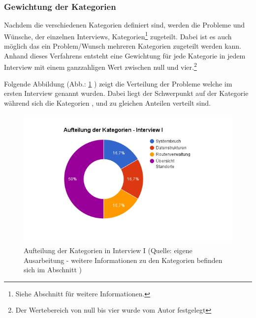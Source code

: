 \documentclass[Bachelorarbeit.tex]{subfiles}
\begin{document}
\subsubsection{Gewichtung der Kategorien}
\label{analyse:gewichtung}

Nachdem die verschiedenen Kategorien definiert sind, werden die Probleme und Wünsche, der einzelnen Interviews, Kategorien\footnote{
	Siehe Abschnitt  für weitere Informationen.
	}
zugeteilt.
Dabei ist es auch möglich das ein Problem/Wunsch mehreren Kategorien zugeteilt werden kann.
Anhand dieses Verfahrens entsteht eine Gewichtung für jede Kategorie in jedem Interview mit einem ganzzahligen Wert zwischen null und vier.\footnote
	{Der Wertebereich von null bis vier wurde vom Autor festgelegt}


Folgende Abbildung (Abb.: \ref{fig:ProblemeInterview1} ) zeigt die Verteilung der Probleme welche im ersten Interview genannt wurden. 
Dabei liegt der Schwerpunkt auf der Kategorie  während sich die Kategorien ,  und  zu gleichen Anteilen verteilt sind.

\begin{figure}[H]
	\centering
	\includegraphics[width=1\linewidth]{img/Interviews/KategorienI1}
	\caption[Probleme Interview I]{Aufteilung der Kategorien in Interview I (Quelle: eigene Ausarbeitung - weitere Informationen zu den Kategorien befinden sich im Abschnitt )}
	\label{fig:ProblemeInterview1}
\end{figure}
\end{document}
